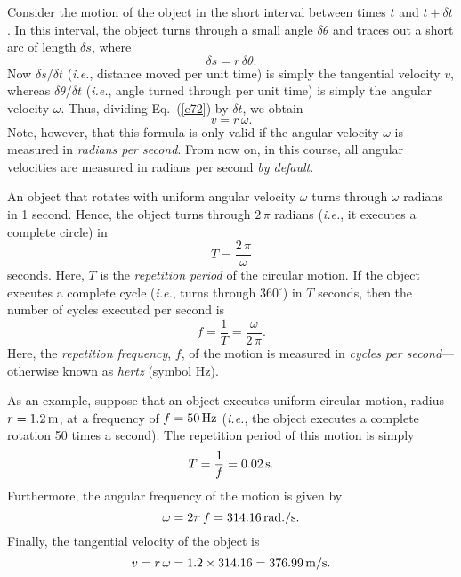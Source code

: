 Consider the motion of the object in the short  interval between times $t$ and $t+\delta t$.
In this interval, the object turns through a small angle $\delta\theta$ and
traces out a short arc of length $\delta s$, where
\begin{equation}\label{e72}
\delta s = r\,\delta\theta.
\end{equation}
Now $\delta s/\delta t$ ({\em i.e.}, distance moved per unit time) 
is simply the tangential velocity $v$, whereas $\delta\theta /\delta t$ 
({\em i.e.}, angle turned through  per unit time) is simply the angular velocity
$\omega$. Thus, dividing  Eq.~(\ref{e72}) by $\delta t$, we obtain 
\begin{equation}
v = r\,\omega.\label{e76}
\end{equation}
Note, however, that this formula is only valid if the angular velocity 
$\omega$ is measured in {\em radians per second}. From now on, in this
course, all angular velocities are measured in radians per second {\em by default}.

An object that rotates with uniform angular velocity $\omega$ turns through
$\omega$ radians in 1 second. Hence, the object turns through $2\,\pi$ radians
({\em i.e.}, it executes a complete circle) in 
\begin{equation}
T = \frac{2\,\pi}{\omega}
\end{equation}
seconds. Here, $T$ is the {\em  repetition period} of the circular motion. If the object
executes a complete cycle ({\em i.e.}, turns through $360^\circ$) in $T$ seconds,
then the number of cycles executed per second is
\begin{equation}
f = \frac{1}{T} = \frac{\omega}{2\,\pi}.
\end{equation}
Here, the {\em repetition frequency}, $f$, of the motion is measured in
{\em cycles per second}---otherwise known as {\em hertz} (symbol Hz).

As an example, suppose that an object executes uniform circular motion,  radius
$r=1.2\,{\rm m}$, at a frequency of $f=50\,{\rm Hz}$ ({\em i.e.}, the object executes a complete
rotation 50 times a second). The repetition period of this motion is simply
\begin{equation}
T = \frac{1}{f} = 0.02\,{\rm s}.
\end{equation}
Furthermore, the angular frequency of the motion is given by
\begin{equation}
\omega = 2\pi\,f = 314.16\,{\rm rad. / s}.
\end{equation}
Finally, the tangential velocity of the object is
\begin{equation}
v = r\,\omega = 1.2\times 314.16 =376.99\,{\rm m/s}.
\end{equation}

